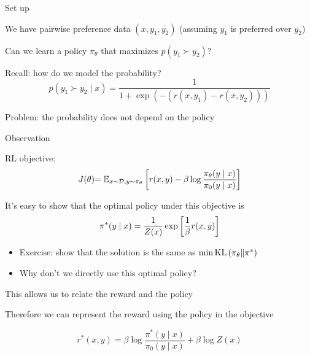 \documentclass[usenames,dvipsnames,notes,11pt,aspectratio=169,hyperref={colorlinks=true, linkcolor=blue}]{beamer}
\begin{document}
\begin{frame}
    {Set up}
    \begin{wideitemize}
        \item We have pairwise preference data $(x, y_1,  y_2)$ (assuming $y_1$ is preferred over $y_2$)
        \item Can we learn a policy $\pi_\theta$ that maximizes $p(y_1 \succ y_2)$?
        \item Recall: how do we model the probability?
            $$
            p(y_1 \succ y_2 \mid x) = \frac{1}{1+\exp(-(r(x,y_1) - r(x,y_2)))}
            $$
        \item Problem: the probability does not depend on the policy
    \end{wideitemize}
\end{frame}

\begin{frame}
    {Observation}
    \begin{wideitemize}[<+->]
        \item RL objective: 
            \begin{align*}
                J(\theta) 
                {= \mathbb{E}_{x\sim\mathcal{D}, y\sim\pi_\theta}\left[ r(x,y) - \beta\log\frac{\pi_\theta(y\mid x)}{\pi_0(y\mid x)} \right] }
            \end{align*}
        \item It's easy to show that the optimal policy under this objective is
            $$
            \pi^*(y\mid x) = \frac{1}{Z(x)}\exp\left[ \frac{1}{\beta}r(x,y) \right]
            $$
            \begin{itemize}
                \item Exercise: show that the solution is the same as $\min \text{KL}\left( \pi_\theta \| \pi^* \right)$
                \item Why don't we directly use this optimal policy?
            \end{itemize}
        \item This allows us to relate the reward and the policy
        \item Therefore we can represent the reward using the policy in the objective
            \begin{mdframed}[linewidth=0pt, backgroundcolor=blue!20]
            $$
            r^*(x,y) = \beta\log\frac{\pi^*(y\mid x)}{\pi_0(y\mid x)} + \beta\log Z(x)
            $$
            \end{mdframed}
    \end{wideitemize}
\end{frame}
\end{document}
